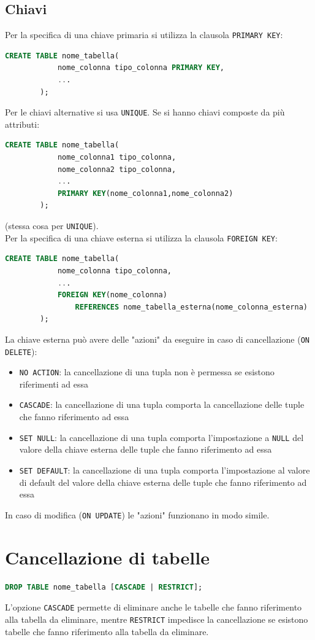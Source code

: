 \documentclass[12pt, a4paper]{report}
\begin{document}
    \subsection{Chiavi}
    Per la specifica di una chiave primaria si utilizza la clausola \texttt{PRIMARY KEY}:
    \begin{lstlisting}[language=SQL]
        CREATE TABLE nome_tabella(
            nome_colonna tipo_colonna PRIMARY KEY,
            ...
        );
    \end{lstlisting}
    Per le chiavi alternative si usa \texttt{UNIQUE}. Se si hanno chiavi composte da più attributi:
    \begin{lstlisting}[language=SQL]
        CREATE TABLE nome_tabella(
            nome_colonna1 tipo_colonna,
            nome_colonna2 tipo_colonna,
            ...
            PRIMARY KEY(nome_colonna1,nome_colonna2)
        );
    \end{lstlisting}
    (stessa cosa per \texttt{UNIQUE}).\\
    Per la specifica di una chiave esterna si utilizza la clausola \texttt{FOREIGN KEY}:
    \begin{lstlisting}[language=SQL]
        CREATE TABLE nome_tabella(
            nome_colonna tipo_colonna,
            ...
            FOREIGN KEY(nome_colonna)
                REFERENCES nome_tabella_esterna(nome_colonna_esterna)
        );
    \end{lstlisting}
    La chiave esterna può avere delle "azioni" da eseguire in caso di cancellazione (\texttt{ON DELETE}):
    \begin{itemize}
        \item \texttt{NO ACTION}: la cancellazione di una tupla non è permessa se esistono riferimenti ad essa
        \item \texttt{CASCADE}: la cancellazione di una tupla comporta la cancellazione delle tuple che fanno riferimento ad essa
        \item \texttt{SET NULL}: la cancellazione di una tupla comporta l'impostazione a \texttt{NULL} del valore della chiave esterna delle tuple che fanno riferimento ad essa
        \item \texttt{SET DEFAULT}: la cancellazione di una tupla comporta l'impostazione al valore di default del valore della chiave esterna delle tuple che fanno riferimento ad essa
    \end{itemize}
    In caso di modifica (\texttt{ON UPDATE}) le "azioni" funzionano in modo simile.
    \section{Cancellazione di tabelle}
    \begin{lstlisting}[language=SQL]
        DROP TABLE nome_tabella [CASCADE | RESTRICT];
    \end{lstlisting}
    L'opzione \texttt{CASCADE} permette di eliminare anche le tabelle che fanno riferimento alla tabella da eliminare, mentre \texttt{RESTRICT} impedisce la cancellazione se esistono tabelle che fanno riferimento alla tabella da eliminare.
\end{document}
